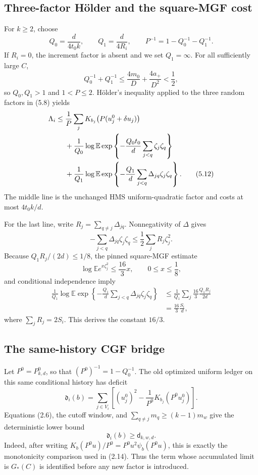 \subsection{Three-factor H\"older and the square-MGF cost}

For \(k\ge2\), choose
\[
 Q_0=\frac d{4t_0k},\qquad Q_1=\frac d{4R_i},\qquad
 P^{-1}=1-Q_0^{-1}-Q_1^{-1}.
\tag{5.10}
\]
If \(R_i=0\), the increment factor is absent and we set \(Q_1=\infty\).
For all sufficiently large \(C\),
\[
 Q_0^{-1}+Q_1^{-1}
 \le\frac{4m_0}{D}+\frac{4a_+}{D^2}<\frac12,
\tag{5.11}
\]
so \(Q_0,Q_1>1\) and \(1<P\le2\).  H\"older's inequality applied to
the three random factors in (5.8) yields
\begin{align}
\Lambda_i\le{}&
\frac1P\sum_jK_{b_j}\bigl(P(u_j^0+\delta u_j)\bigr)\notag\\
&+\frac1{Q_0}\log\mathbb E
\exp\left\{-\frac{Q_0t_0}{d}\sum_{j<q}\zeta_j\zeta_q\right\}\notag\\
&+\frac1{Q_1}\log\mathbb E
\exp\left\{-\frac{Q_1}{d}\sum_{j<q}\Delta_{jq}\zeta_j\zeta_q\right\}.
\tag{5.12}
\end{align}
The middle line is the unchanged HMS uniform-quadratic factor and costs at
most \(4t_0k/d\).

For the last line, write
\(R_j=\sum_{q\ne j}\Delta_{jq}\).  Nonnegativity of \(\Delta\) gives
\[
 -\sum_{j<q}\Delta_{jq}\zeta_j\zeta_q
 \le\frac12\sum_jR_j\zeta_j^2.
\tag{5.13}
\]
Because \(Q_1R_j/(2d)\le1/8\), the pinned square-MGF estimate
\[
 \log\mathbb E e^{x\zeta_j^2}\le\frac{16}{3}x,
 \qquad 0\le x\le\frac18,
\tag{5.14}
\]
and conditional independence imply
\[
\begin{aligned}
\frac1{Q_1}\log\mathbb E
\exp\left\{-\frac{Q_1}{d}\sum_{j<q}\Delta_{jq}\zeta_j\zeta_q\right\}
&\le\frac1{Q_1}\sum_j\frac{16}{3}
\frac{Q_1R_j}{2d}\\
&=\frac{16}{3}\frac{S_i}{d},
\end{aligned}
\tag{5.15}
\]
where \(\sum_jR_j=2S_i\).  This derives the constant \(16/3\).

\subsection{The same-history CGF bridge}

Let \(P^0=P^0_{k,d}\), so that
\((P^0)^{-1}=1-Q_0^{-1}\).  The old optimized uniform ledger on this
same conditional history has deficit
\[
 \mathfrak d_i(b)=\sum_{j\in V_i}\left[
 (u_j^0)^2-\frac1{P^0}K_{b_j}(P^0u_j^0)\right].
\tag{5.16}
\]
Equations (2.6), the cutoff window, and
\(\sum_{q\ne j}m_q\ge(k-1)m_w\) give the deterministic lower bound
\[
 \mathfrak d_i(b)\ge\mathsf d_{k,w,d}.
\tag{5.17}
\]
Indeed, after writing
\(K_b(P^0u)/P^0=P^0u^2\psi_b(P^0u)\), this is exactly the
monotonicity comparison used in (2.14).  Thus the term whose accumulated
limit is \(G_*(C)\) is identified before any new factor is introduced.

